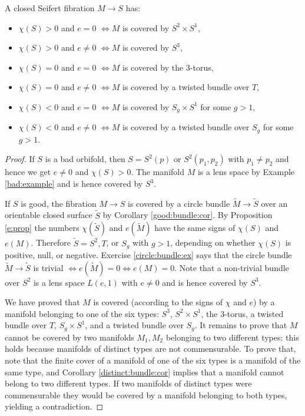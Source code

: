 \begin{prop} \label{cover:Seifert:prop}
A closed Seifert fibration $M\to S$ has:
\begin{itemize}
\item $\chi(S)>0$ and $e=0$ $\Longleftrightarrow M$ is covered by $S^2\times S^1$,
\item $\chi(S)>0$ and $e\neq 0$ $\Longleftrightarrow M$ is covered by $S^3$,
\item $\chi(S)=0$ and $e=0$ $\Longleftrightarrow M$ is covered by the 3-torus,
\item $\chi(S)=0$ and $e\neq 0$ $\Longleftrightarrow M$ is covered by a twisted bundle over $T$,
\item $\chi(S)<0$ and $e=0$ $\Longleftrightarrow M$ is covered by $S_g \times S^1$ for some $g>1$,
\item $\chi(S)<0$ and $e\neq 0$ $\Longleftrightarrow M$ is covered by a twisted bundle over $S_g$ for some $g>1$.
\end{itemize}
\end{prop}
\begin{proof}
If $S$ is a bad orbifold, then $S=S^2(p)$ or $S^2(p_1,p_2)$ with $p_1\neq p_2$ and hence we get $e\neq 0$ and $\chi(S)>0$. The manifold $M$ is a lens space by Example \ref{bad:example} and is hence covered by $S^3$.

If $S$ is good, the fibration $M\to S$ is covered by a circle bundle $\tilde M\to \tilde S$ over an orientable closed surface $\tilde S$ by Corollary \ref{good:bundle:cor}. By Proposition \ref{e:prop} the numbers $\chi(\tilde S)$ and $e(\tilde M)$ have the same signs of $\chi(S)$ and $e(M)$. Therefore $\tilde S = S^2, T$, or $S_g$ with $g> 1$, depending on whether $\chi(S)$ is positive, null, or negative. 
Exercise \ref{circle:bundle:ex} says that the circle bundle $\tilde M \to \tilde S$ is trivial $\Longleftrightarrow e(\tilde M) =0 \Longleftrightarrow e(M) =0$. Note that a non-trivial bundle over $S^2$ is a lens space $L(e,1)$ with $e\neq 0$ and is hence covered by $S^3$.

We have proved that $M$ is covered (according to the signs of $\chi$ and $e$) by a manifold belonging to one of the six types: $S^3$, $S^2\times S^1$, the 3-torus, a twisted bundle over $T$, $S_g\times S^1$, and a twisted bundle over $S_g$. It remains to prove that $M$ cannot be covered by two manifolds $M_1, M_2$ belonging to two different types: this holds because manifolds of distinct types are not commensurable. To prove that, note that the finite cover of a manifold of one of the six types is a manifold of the same type, and Corollary \ref{distinct:bundle:cor} implies that a manifold cannot belong to two different types. If two manifolds of distinct types were commensurable they would be covered by a manifold belonging to both types, yielding a contradiction.
\end{proof}


